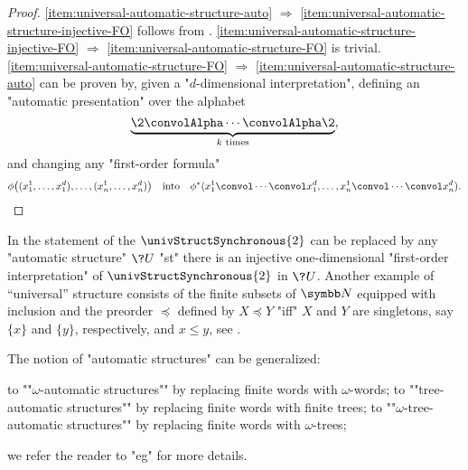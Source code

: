 \begin{proof}
	\eqref{item:universal-automatic-structure-auto} $\Rightarrow$
	\eqref{item:universal-automatic-structure-injective-FO} follows from
	.
	\eqref{item:universal-automatic-structure-injective-FO} $\Rightarrow$
	\eqref{item:universal-automatic-structure-FO} is trivial.
	\eqref{item:universal-automatic-structure-FO} $\Rightarrow$
	\eqref{item:universal-automatic-structure-auto} can be proven by,
	given a "$d$-dimensional interpretation", defining an "automatic presentation"
	over the alphabet
	\[
		\underbrace{\2 \convolAlpha \cdots \convolAlpha \2}_{
			\text{$k$ times}
		},
	\]
	and changing any "first-order formula"
	\[
		\phi\big((x_1^1, \dotsc, x_1^d), \dotsc, (x_n^1, \dotsc, x_n^d)\big)
		\quad\text{into}\quad
		\phi^*(x_1^1 \convol \cdots \convol x_1^d, \dotsc, x_n^1 \convol \cdots \convol x_n^d).\qedhere
	\]
\end{proof}

In the statement of \label{prop:universal-automatic-structure} the
$\univStructSynchronous{2}$ can be replaced by any "automatic structure" $\?U$
"st" there is an injective one-dimensional "first-order interpretation" of
$\univStructSynchronous{2}$ in $\?U$. 
Another example of ``universal'' structure consists of the finite subsets of $\N$ equipped
with inclusion and the preorder $\preceq$ defined by $X \preceq Y$ "iff" $X$ and $Y$ are 
singletons, say $\{x\}$ and $\{y\}$, respectively, and $x \leq y$,
see \cite[Theorem~XII.2.3]{Blumensath2024MSOModelTheory}.

The notion of "automatic structures" can be generalized:
\begin{itemize}
	\itemAP to ""$\omega$-automatic structures"" by replacing finite words with $\omega$-words;
	\itemAP to ""tree-automatic structures"" by replacing finite words with finite trees;
	\itemAP to ""$\omega$-tree-automatic structures"" by replacing finite words with $\omega$-trees;
\end{itemize}
we refer the reader to "eg" \cite[\S~XII]{Blumensath2024MSOModelTheory} for more details.


